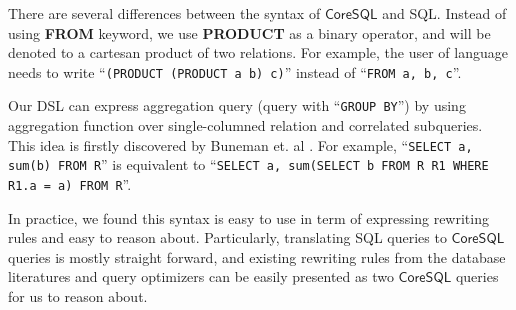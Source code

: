 There are several differences between the syntax of $\mathsf{CoreSQL}$ and SQL. Instead of using \textbf{FROM} keyword, we use \textbf{PRODUCT} as a binary operator, and will be denoted to a cartesan product of two relations. For example, the user of language needs to write ``\lstinline[style=sql, keywords={}]{(PRODUCT (PRODUCT a b) c)}'' instead of ``\lstinline[style=sql, keywords={}]{FROM a, b, c}''.  

Our DSL can express aggregation query (query with ``\lstinline[style=sql, keywords={}]{GROUP BY}'') by
using aggregation function over single-columned relation and correlated subqueries. This idea is firstly discovered by Buneman et. al \cite{comp_syntax}. For example, ``\lstinline[style=sql, keywords={}]{SELECT a, sum(b) FROM R}'' 
is equivalent to ``\lstinline[style=sql, keywords={}]{SELECT a, sum(SELECT b FROM R R1 WHERE R1.a = a) FROM R}''.


In practice, we found this syntax is easy to use in term of expressing 
rewriting rules and easy to reason about. Particularly, translating SQL queries to $\mathsf{CoreSQL}$ queries is mostly straight forward, and existing rewriting rules from the database 
literatures and query optimizers can be easily presented as two $\mathsf{CoreSQL}$ queries for us to reason about.

